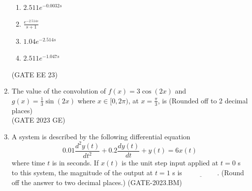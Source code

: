 \begin{enumerate}[label=\thechapter.\arabic*,ref=\thechapter.\theenumi]
\begin{figure}[!h]
    \caption{}
    \label{fig:EEgatefig36.23}
\end{figure}
\begin{enumerate}
    \item $2.511 e^{-0.0032s}$\\
    \item $\frac{e^{-2.514s}}{s+1}$\\
    \item $1.04e^{-2.514s}$\\
    \item $2.511 e^{-1.047s}$\\
\end{enumerate} \hfill{(GATE EE 23)}\\

\solution

\newpage
\item The value of the convolution of $f(x) = 3\cos(2x)$ and $g(x) = \frac{1}{3}\sin(2x)$ where $x \in [0, 2\pi)$, at $x = \frac{\pi}{3}$, is (Rounded off to 2 decimal places)\\
\hfill (GATE 2023 GE)\\
\solution
\pagebreak
\item A system is described by the following differential equation
    \[
    0.01 \frac{d^2y(t)}{dt^2} + 0.2\frac{dy(t)}{dt} + y(t) = 6x(t)
    \]
    where time \( t \) is in seconds. If \( x(t) \) is the unit step input applied at \( t = 0 \) s to this system, the magnitude of the output at \( t = 1 \) s is \(\underline{\hspace{2cm}}\). (Round off the answer to two decimal places.)
    \hfill (GATE-2023.BM)\\
    \solution
    \pagebreak
\end{enumerate}
